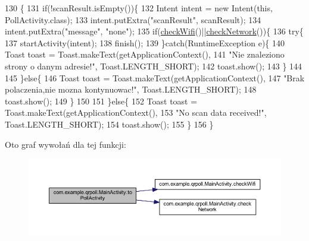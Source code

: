 \begin{DoxyCode}
130                                                  \{
131         \textcolor{keywordflow}{if}(!scanResult.isEmpty())\{
132             Intent intent = \textcolor{keyword}{new} Intent(\textcolor{keyword}{this}, PollActivity.class);
133             intent.putExtra(\textcolor{stringliteral}{"scanResult"}, scanResult);
134             intent.putExtra(\textcolor{stringliteral}{"message"}, \textcolor{stringliteral}{"none"});
135             \textcolor{keywordflow}{if}(\hyperlink{classcom_1_1example_1_1qrpoll_1_1_main_activity_a0433b5df97dcca7db8593f32d8d033b9}{checkWifi}()||\hyperlink{classcom_1_1example_1_1qrpoll_1_1_main_activity_af92255e3a196405eeb55e06bb625d435}{checkNetwork}())\{
136                 \textcolor{keywordflow}{try}\{
137                 startActivity(intent);
138                 finish();
139                 \}\textcolor{keywordflow}{catch}(RuntimeException e)\{
140                     Toast toast = Toast.makeText(getApplicationContext(),
141                             \textcolor{stringliteral}{"Nie znaleziono strony o danym adresie!"}, Toast.LENGTH\_SHORT);
142                         toast.show();
143                 \}
144                 
145             \}\textcolor{keywordflow}{else}\{
146                 Toast toast = Toast.makeText(getApplicationContext(),
147                         \textcolor{stringliteral}{"Brak polaczenia,nie mozna kontynuowac!"}, Toast.LENGTH\_SHORT);
148                     toast.show();
149             \}
150         
151         \}\textcolor{keywordflow}{else}\{
152             Toast toast = Toast.makeText(getApplicationContext(),
153                     \textcolor{stringliteral}{"No scan data received!"}, Toast.LENGTH\_SHORT);
154                 toast.show();
155         \}
156     \}
\end{DoxyCode}


Oto graf wywołań dla tej funkcji\+:
\nopagebreak
\begin{figure}[H]
\begin{center}
\leavevmode
\includegraphics[width=350pt]{classcom_1_1example_1_1qrpoll_1_1_main_activity_ac108fe2528d7657f970d61d49639e6ac_cgraph}
\end{center}
\end{figure}




